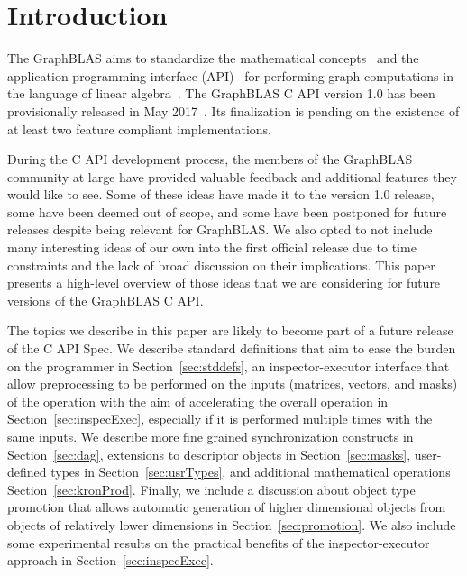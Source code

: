 %
%
\section{Introduction}
\label{sec:intro}
The GraphBLAS aims to standardize the mathematical concepts~\cite{mathgraphblas16} and the application programming interface (API)~\cite{graphblas_capi_17} for performing graph computations in the language of linear algebra~\cite{kepner2011graph}. The GraphBLAS C API version 1.0 has been provisionally released in May 2017~\cite{graphblasapi}. Its finalization is pending on the existence of at least two feature compliant implementations. 

During the C API development process, the members of the GraphBLAS community at large have provided valuable feedback and additional features they would like to see. Some of these ideas have made it to the version 1.0 release, some have been deemed out of scope, and some have been postponed for future releases despite being relevant for GraphBLAS. We also opted to not include many interesting ideas of our own into the first official release due to time constraints and the lack of broad discussion on their implications. This paper presents a high-level overview of those ideas that we are considering for future versions of the GraphBLAS C API.

The topics we describe in this paper are likely to become part of a future release of the C API Spec. We describe standard definitions that aim to ease the burden on the programmer in Section~\ref{sec:stddefs}, an inspector-executor interface that allow preprocessing to be performed on the inputs (matrices, vectors, and masks) of the operation with the aim of accelerating the overall operation in Section~\ref{sec:inspecExec}, especially if it is performed multiple times with the same inputs.
We describe more fine grained synchronization constructs in Section~\ref{sec:dag}, extensions to descriptor objects in Section~\ref{sec:masks}, user-defined types in Section~\ref{sec:usrTypes}, and additional mathematical operations Section~\ref{sec:kronProd}. Finally, we include a discussion about object type promotion that allows automatic generation of higher dimensional objects from objects of relatively lower dimensions in Section~\ref{sec:promotion}. We also include some experimental results on the practical benefits of the inspector-executor approach in Section~\ref{sec:inspecExec}. 

